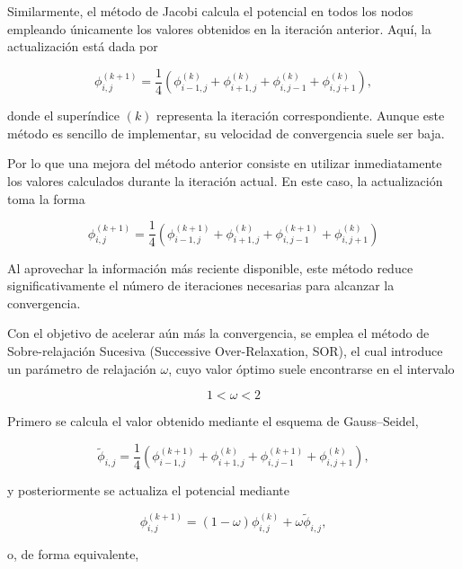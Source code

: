 \documentclass[12pt, twocolumn]{article}
\begin{document}
Similarmente, el método de Jacobi calcula el potencial en todos los nodos empleando únicamente los valores obtenidos en la iteración anterior. Aquí, la actualización está dada por

\begin{equation}
\phi_{i,j}^{(k+1)}
=
\frac{1}{4}
\left(
\phi_{i-1,j}^{(k)}
+
\phi_{i+1,j}^{(k)}
+
\phi_{i,j-1}^{(k)}
+
\phi_{i,j+1}^{(k)}
\right),
\end{equation}

donde el superíndice $(k)$ representa la iteración correspondiente. Aunque este método es sencillo de implementar, su velocidad de convergencia suele ser baja.

Por lo que una mejora del método anterior consiste en utilizar inmediatamente los valores calculados durante la iteración actual. En este caso, la actualización toma la forma

\begin{equation*}
\phi_{i,j}^{(k+1)}
=
\frac{1}{4}
\left(
\phi_{i-1,j}^{(k+1)}
+
\phi_{i+1,j}^{(k)}
+
\phi_{i,j-1}^{(k+1)}
+
\phi_{i,j+1}^{(k)}
\right)
\end{equation*}

Al aprovechar la información más reciente disponible, este método reduce significativamente el número de iteraciones necesarias para alcanzar la convergencia.

Con el objetivo de acelerar aún más la convergencia, se emplea el método de Sobre-relajación Sucesiva (Successive Over-Relaxation, SOR), el cual introduce un parámetro de relajación $\omega$, cuyo valor óptimo suele encontrarse en el intervalo

\begin{equation*}
    1 < \omega < 2
\end{equation*}

Primero se calcula el valor obtenido mediante el esquema de Gauss--Seidel,

\begin{equation}
\tilde{\phi}_{i,j}
=
\frac{1}{4}
\left(
\phi_{i-1,j}^{(k+1)}
+
\phi_{i+1,j}^{(k)}
+
\phi_{i,j-1}^{(k+1)}
+
\phi_{i,j+1}^{(k)}
\right),
\end{equation}

y posteriormente se actualiza el potencial mediante

\begin{equation}
\phi_{i,j}^{(k+1)}
=
(1-\omega)\phi_{i,j}^{(k)}
+
\omega\tilde{\phi}_{i,j},
\end{equation}

o, de forma equivalente,
\end{document}
